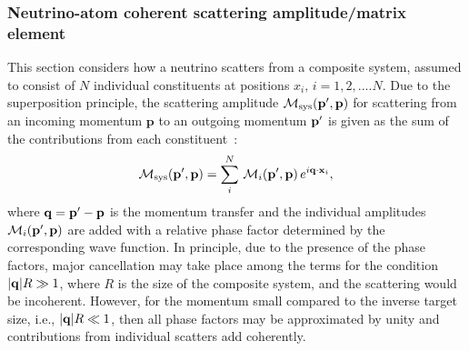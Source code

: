 \subsubsection{Neutrino-atom coherent scattering amplitude/matrix element} 
This section considers how a neutrino scatters from a composite system, assumed to consist of $N$ individual constituents at positions $x_i,\,i=1,2,....N$. Due to the superposition principle, the scattering amplitude $\mathcal{M}_\mathrm{sys}(\bold{p}^\prime,\bold{p})$ for scattering from an incoming momentum $\mathbf{p}$ to an outgoing momentum $\bold{p}^\prime$ is given as the sum of the contributions from each constituent~\cite{Freedman:1977xn,Papavassiliou:2005cs}:
\begin{align}
\mathcal{M}_\mathrm{sys}(\bold{p}^\prime,\bold{p})=\sum_i^N\,\mathcal{M}_i(\bold{p}^\prime,\bold{p})\,e^{i\bold{q}\cdot\bold{x}_i},
\end{align}
where $\bold{q}=\bold{p}^\prime-\bold{p}$ is the momentum transfer and the individual amplitudes $\mathcal{M}_i(\bold{p}^\prime,\bold{p})$ are added with a relative phase factor determined by the corresponding wave function. %
In principle, due to the presence of the phase factors, major cancellation may take place among the terms for the condition $|\bold{q}|R\gg1$, where $R$ is the size of the composite system, and the scattering would be incoherent. However, for the momentum small compared to the inverse target size, i.e., $|\bold{q}|R\ll1$, then all phase factors may be approximated by unity and contributions from individual scatters add coherently. 


